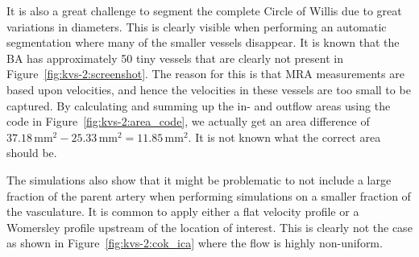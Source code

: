 It is also a great challenge to segment the complete Circle of Willis due to great
variations in diameters. This is clearly visible when performing an
automatic segmentation where many of the smaller vessels disappear.
It is known that the BA has approximately 50 tiny vessels that are
clearly not present in Figure~\ref{fig:kvs-2:screenshot}. The reason
for this is that MRA measurements are based upon velocities, and hence
the velocities in these vessels are too small to be captured. By
calculating and summing up the in- and outflow areas using the code in
Figure~\ref{fig:kvs-2:area_code}, we actually get an area difference
of
$37.18\,\mathrm{mm}^2-25.33\,\mathrm{mm}^2=11.85\,\mathrm{mm}^2$. It
is not known what the correct area should be.

The simulations also show that it might be problematic to not include
a large fraction of the parent artery when performing simulations\enlargethispage{12pt} 
on a smaller fraction of the vasculature. It is common to apply either a
flat velocity profile or a Womersley profile upstream of the location
of interest. This is clearly not the case as shown in
Figure~\ref{fig:kvs-2:cok_ica} where the flow is highly non-uniform.


\endgroup

